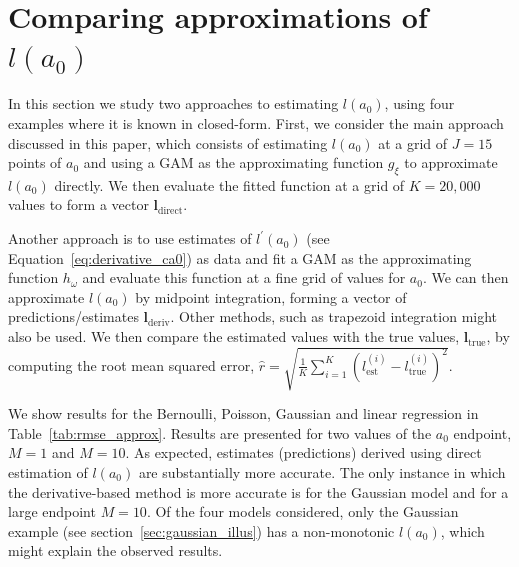 \documentclass[a4paper, notitlepage, 11pt]{article}
\begin{document}



\section{Comparing approximations of $l(a_0)$}
\label{sec:derivative_only}

In this section we study two approaches to estimating $l(a_0)$, using four examples where it is known in closed-form.
First, we consider the main approach discussed in this paper, which consists of estimating $l(a_0)$ at a grid of $J = 15$ points of $a_0$ and using a GAM as the approximating function $g_\xi$ to approximate $l(a_0)$ directly.
We then evaluate the fitted function at a grid of $K = 20,000$ values to form a vector $\boldsymbol l_{\text{direct}}$.

Another approach is to use estimates of $l^\prime(a_0)$ (see Equation~\ref{eq:derivative_ca0}) as data and fit a GAM as the approximating function $h_\omega$ and evaluate this function at a fine grid of values for $a_0$.
We can then approximate $l(a_0)$ by midpoint integration, forming a vector of predictions/estimates $\boldsymbol l_{\text{deriv}}$.
Other methods, such as trapezoid integration might also be used.
We then compare the estimated values with the true values, $\boldsymbol l_{\text{true}}$, by computing the root mean squared error, $\hat{r} = \sqrt{\frac{1}{K} \sum_{i= 1}^K \left( l^{(i)}_{\text{est}} - l^{(i)}_{\text{true}} \right)^2 }$.

We show results for the Bernoulli, Poisson, Gaussian and linear regression in Table~\ref{tab:rmse_approx}.
Results are presented for two values of the $a_0$ endpoint, $M = 1$ and $M = 10$.
As expected, estimates (predictions) derived using direct estimation of $l(a_0)$ are substantially more accurate.
The only instance in which the derivative-based method is more accurate is for the Gaussian model and for a large endpoint $M = 10$.
Of the four models considered, only the Gaussian example (see section~\ref{sec:gaussian_illus}) has a non-monotonic $l(a_0)$, which might explain the observed results.
\end{document}
